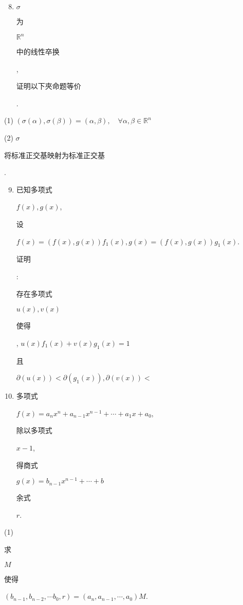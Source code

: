 \documentclass[10pt]{article}
\begin{document}
\begin{enumerate}
  \setcounter{enumi}{7}
  \item $\sigma$ \begin{CJK}{UTF8}{mj}为\end{CJK} $\mathbb{R}^{n}$ \begin{CJK}{UTF8}{mj}中的线性卒换\end{CJK}, \begin{CJK}{UTF8}{mj}证明以下夾命题等价\end{CJK}.
\end{enumerate}
(1) $(\sigma(\alpha), \sigma(\beta))=(\alpha, \beta), \quad \forall \alpha, \beta \in \mathbb{R}^{n}$

(2) $\sigma$ \begin{CJK}{UTF8}{mj}将标准正交基映射为标准正交基\end{CJK}.

\begin{enumerate}
  \setcounter{enumi}{8}
  \item \begin{CJK}{UTF8}{mj}已知多项式\end{CJK} $f(x), g(x)$, \begin{CJK}{UTF8}{mj}设\end{CJK} $f(x)=(f(x), g(x)) f_{1}(x), g(x)=(f(x), g(x)) g_{1}(x)$. \begin{CJK}{UTF8}{mj}证明\end{CJK}: \begin{CJK}{UTF8}{mj}存在多项式\end{CJK} $u(x), v(x)$ \begin{CJK}{UTF8}{mj}使得\end{CJK}, $u(x) f_{1}(x)+v(x) g_{1}(x)=1$ \begin{CJK}{UTF8}{mj}且\end{CJK} $\partial(u(x))<\partial\left(g_{1}(x)\right), \partial(v(x))<$

  \item \begin{CJK}{UTF8}{mj}多项式\end{CJK} $f(x)=a_{n} x^{n}+a_{n-1} x^{n-1}+\cdots+a_{1} x+a_{0}$, \begin{CJK}{UTF8}{mj}除以多项式\end{CJK} $x-1$, \begin{CJK}{UTF8}{mj}得商式\end{CJK} $g(x)=b_{n-1} x^{n-1}+\cdots+b$ \begin{CJK}{UTF8}{mj}余式\end{CJK} $r$.

\end{enumerate}
(1) \begin{CJK}{UTF8}{mj}求\end{CJK} $M$ \begin{CJK}{UTF8}{mj}使得\end{CJK} $\left(b_{n-1}, b_{n-2}, \cdots b_{0}, r\right)=\left(a_{n}, a_{n-1}, \cdots, a_{0}\right) M$.
\end{document}
